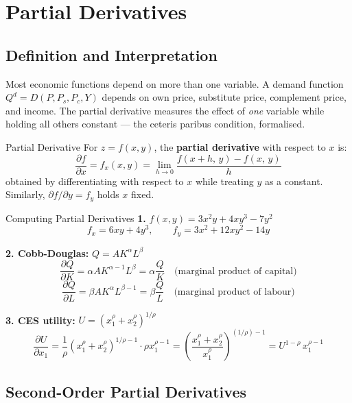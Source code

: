 \documentclass[12pt, a4paper]{article}
\theoremstyle{definition}
\newcommand{\pp}[2]{\dfrac{\partial #1}{\partial #2}}
\newcommand{\limit}[2]{\lim_{#1 \to #2}}
\begin{document}
\section{Partial Derivatives}

\subsection{Definition and Interpretation}

Most economic functions depend on more than one variable.
A demand function $Q^d = D(P, P_s, P_c, Y)$ depends on own price,
substitute price, complement price, and income.  The partial derivative
measures the effect of \emph{one} variable while holding all others constant
--- the ceteris paribus condition, formalised.

\begin{defbox}{Partial Derivative}
For $z = f(x,y)$, the \textbf{partial derivative} with respect to $x$ is:
\[
  \pp{f}{x} = f_x(x,y)
  = \limit{h}{0}\frac{f(x+h,\,y) - f(x,\,y)}{h}
\]
obtained by differentiating with respect to $x$ while treating $y$ as a
constant.  Similarly, $\partial f/\partial y = f_y$ holds $x$ fixed.
\end{defbox}

\begin{exbox}{Computing Partial Derivatives}
\textbf{1.} $f(x,y) = 3x^2y + 4xy^3 - 7y^2$
\[
  f_x = 6xy + 4y^3, \qquad f_y = 3x^2 + 12xy^2 - 14y
\]

\textbf{2. Cobb-Douglas:} $Q = AK^\alpha L^\beta$
\[
  \pp{Q}{K} = \alpha AK^{\alpha-1}L^\beta
            = \alpha\frac{Q}{K} \quad\text{(marginal product of capital)}
\]
\[
  \pp{Q}{L} = \beta AK^\alpha L^{\beta-1}
            = \beta\frac{Q}{L} \quad\text{(marginal product of labour)}
\]

\textbf{3. CES utility:} $U = (x_1^\rho + x_2^\rho)^{1/\rho}$
\[
  \pp{U}{x_1}
  = \frac{1}{\rho}(x_1^\rho+x_2^\rho)^{1/\rho-1}\cdot\rho x_1^{\rho-1}
  = \left(\frac{x_1^\rho+x_2^\rho}{x_1^\rho}\right)^{(1/\rho)-1}
  = U^{1-\rho}\,x_1^{\rho-1}
\]
\end{exbox}

\subsection{Second-Order Partial Derivatives}
\end{document}
